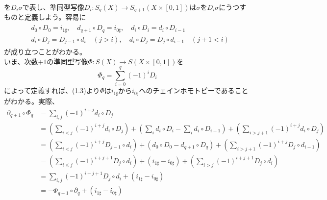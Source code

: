 \documentclass[dvipdfmx,a4paper,11pt]{jsarticle}
\begin{document}
\begin{tcolorbox}[title = 補題1,upperbox = visible]
\begin{center}
  \end{center}
  を$D_{i}\sigma$で表し、準同型写像$D_{i}: S_{q}(X)\to S_{q+1}(X\times [0,1])$は$\sigma$を$D_{i}\sigma$にうつすものと定義しよう。容易に
  \begin{align}
    \begin{alignedat}{2}
      &d_{0}\circ D_{0}=i_{1\sharp},\quad d_{q+1}\circ D_{q}=i_{0\sharp},\quad d_{i}\circ D_{i}=d_{i}\circ D_{i-1}\\
      &d_{i}\circ D_{j}=D_{j-1}\circ d_{i}\quad (j>i),\quad d_{i}\circ D_{j}=D_{j}\circ d_{i-1}\quad (j+1<i) 
    \end{alignedat}
  \end{align}
  が成り立つことがわかる。\\
  いま、次数$+1$の準同型写像$\Phi : S(X)\to S(X\times [0,1])$を
  \begin{equation*}
    \Phi_{q}=\sum_{i=0}^{q}(-1)^{i}D_{i}
  \end{equation*}
  によって定義すれば、(1.3)より$\Phi$は$i_{1\sharp}$から$i_{0\sharp}$へのチェインホモトピーであることがわかる。実際、
  \begin{align*}
    \partial_{q+1}\circ \Phi_{q}
    &=\sum_{i,j}(-1)^{i+j}d_{i}\circ D_{j}\\
    &=(\sum_{i<j}(-1)^{i+j}d_{i}\circ D_{j})+(\sum_{i}d_{i}\circ D_{i}-\sum_{i}d_{i}\circ D_{i-1})+(\sum_{i>j+1}(-1)^{i+j}d_{i}\circ D_{j})\\
    &=(\sum_{i<j}(-1)^{i+j}D_{j-1}\circ d_{i})+(d_{0}\circ D_{0}-d_{q+1}\circ D_{q})+(\sum_{i>j+1}(-1)^{i+j}D_{j}\circ d_{i-1})\\
    &=(\sum_{i\leq j}(-1)^{i+j+1}D_{j}\circ d_{i})+(i_{1\sharp}-i_{0\sharp})+(\sum_{i>j}(-1)^{i+j+1}D_{j}\circ d_{i})\\
    &=\sum_{i,j}(-1)^{i+j+1}D_{j}\circ d_{i}+(i_{1\sharp}-i_{0\sharp})\\
    &=-\Phi_{q-1}\circ \partial_{q}+(i_{1\sharp}-i_{0\sharp})
  \end{align*}
\end{tcolorbox}

\clearpage
\end{document}
